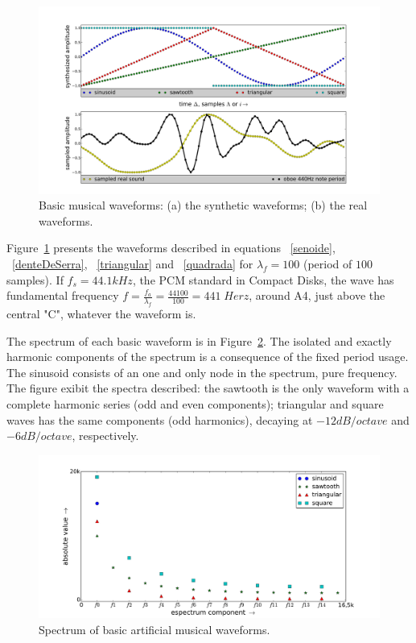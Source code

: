 \documentclass[
 aip,
 jmp,
 amsmath,amssymb,
 reprint,
]{revtex4-1}
\begin{document}
\begin{figure}
    \centering
        \includegraphics[width=\textwidth]{figures/waveForms}
    \caption{Basic musical waveforms: (a) the synthetic  waveforms; (b) the real waveforms.}
        \label{fig:formasDeOnda}
\end{figure}

Figure~\ref{fig:formasDeOnda} presents the waveforms described in equations  ~\ref{senoide}, ~\ref{denteDeSerra}, ~\ref{triangular} and ~\ref{quadrada} for $\lambda_f=100$ (period of $100$ samples). If $f_s=44.1kHz$, the PCM standard in Compact Disks, the wave has fundamental frequency $f=\frac{f_a}{\lambda_f}=\frac{44100}{100} = 441 \; Herz$, around A4, just above the central "C", whatever the waveform is.

The spectrum of each basic waveform is in Figure~\ref{fig:espectroDeOndas}. The isolated and exactly harmonic components of the spectrum is a consequence of the fixed period usage. The sinusoid consists of an one and only node in the spectrum, pure frequency. The figure exibit the spectra described: the sawtooth is the only waveform with a complete harmonic series (odd and even components); triangular and square waves has the same components (odd harmonics), decaying at $-12dB/octave$ and $-6dB/octave$, respectively.

\begin{figure}
    \centering
        \includegraphics[width=\columnwidth]{figures/waveSpectrum}
    \caption{Spectrum of basic artificial musical waveforms.}
        \label{fig:espectroDeOndas}
\end{figure}
\end{document}
